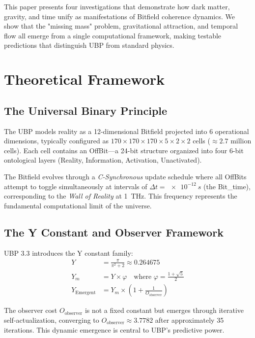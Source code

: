 \documentclass[12pt,a4paper]{article}
\begin{document}
This paper presents four investigations that demonstrate how dark matter, gravity, and time unify as manifestations of Bitfield coherence dynamics. We show that the "missing mass" problem, gravitational attraction, and temporal flow all emerge from a single computational framework, making testable predictions that distinguish UBP from standard physics.

\section{Theoretical Framework}

\subsection{The Universal Binary Principle}

The UBP models reality as a 12-dimensional Bitfield projected into 6 operational dimensions, typically configured as $170 \times 170 \times 170 \times 5 \times 2 \times 2$ cells ($\approx 2.7$ million cells). Each cell contains an OffBit---a 24-bit structure organized into four 6-bit ontological layers (Reality, Information, Activation, Unactivated).

The Bitfield evolves through a \textit{C-Synchronous} update schedule where all OffBits attempt to toggle simultaneously at intervals of $\Delta t = \SI{e-12}{s}$ (the Bit\_time), corresponding to the \textit{Wall of Reality} at \SI{1}{THz}. This frequency represents the fundamental computational limit of the universe.

\subsection{The Y Constant and Observer Framework}

UBP 3.3 introduces the Y constant family:
\begin{align}
Y &= \frac{\pi}{\pi^2 + 2} \approx 0.264675 \\
Y_m &= Y \times \varphi \quad \text{where } \varphi = \frac{1+\sqrt{5}}{2} \\
Y_{\text{Emergent}} &= Y_m \times \left(1 + \frac{1}{O_{\text{observer}}}\right)
\end{align}

The observer cost $O_{\text{observer}}$ is not a fixed constant but emerges through iterative self-actualization, converging to $O_{\text{observer}} \approx 3.7782$ after approximately 35 iterations. This dynamic emergence is central to UBP's predictive power.
\end{document}
